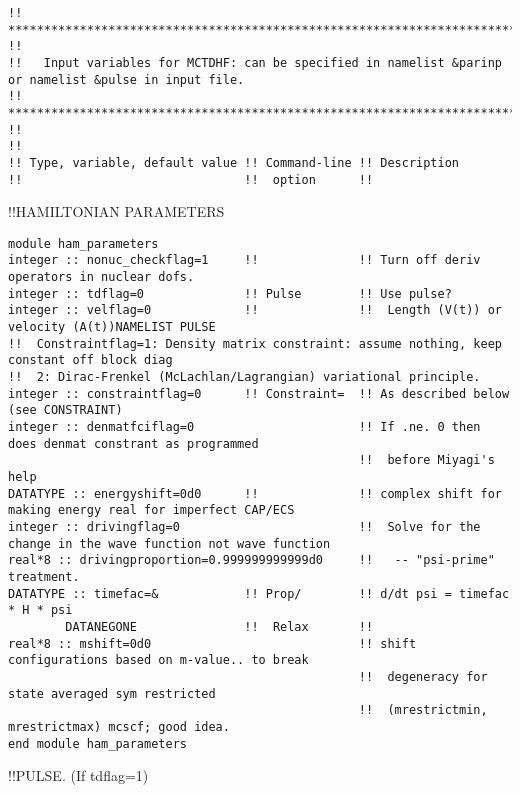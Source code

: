\begin{verbatim}
!! *********************************************************************************************************** !!
!!   Input variables for MCTDHF: can be specified in namelist &parinp or namelist &pulse in input file.
!! *********************************************************************************************************** !!
!!
!! Type, variable, default value !! Command-line !! Description 
!!                               !!  option      !! 
\end{verbatim}
!!{\large \quad HAMILTONIAN PARAMETERS}
\begin{verbatim}
module ham_parameters
integer :: nonuc_checkflag=1     !!              !! Turn off deriv operators in nuclear dofs.
integer :: tdflag=0              !! Pulse        !! Use pulse?
integer :: velflag=0             !!              !!  Length (V(t)) or velocity (A(t))NAMELIST PULSE
!!  Constraintflag=1: Density matrix constraint: assume nothing, keep constant off block diag
!!  2: Dirac-Frenkel (McLachlan/Lagrangian) variational principle.
integer :: constraintflag=0      !! Constraint=  !! As described below (see CONSTRAINT)
integer :: denmatfciflag=0                       !! If .ne. 0 then does denmat constrant as programmed
                                                 !!  before Miyagi's help
DATATYPE :: energyshift=0d0      !!              !! complex shift for making energy real for imperfect CAP/ECS
integer :: drivingflag=0                         !!  Solve for the change in the wave function not wave function 
real*8 :: drivingproportion=0.999999999999d0     !!   -- "psi-prime" treatment.
DATATYPE :: timefac=&            !! Prop/        !! d/dt psi = timefac * H * psi
        DATANEGONE               !!  Relax       !!
real*8 :: mshift=0d0                             !! shift configurations based on m-value.. to break 
                                                 !!  degeneracy for state averaged sym restricted
                                                 !!  (mrestrictmin, mrestrictmax) mcscf; good idea.
end module ham_parameters
\end{verbatim}
!!{\large \quad PULSE.  (If tdflag=1) }
